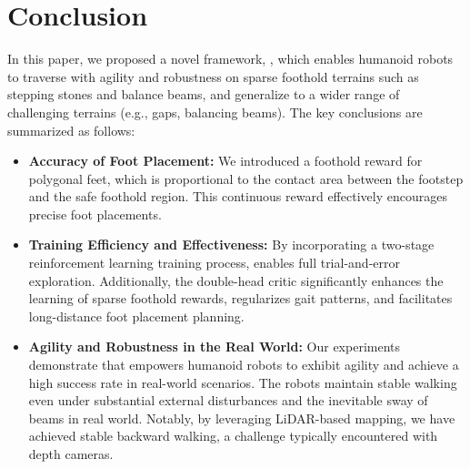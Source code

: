\section{Conclusion}

In this paper, we proposed a novel framework, \beamdojo, which enables humanoid robots to traverse with agility and robustness on sparse foothold terrains such as stepping stones and balance beams, and generalize to a wider range of challenging terrains (e.g., gaps, balancing beams). The key conclusions are summarized as follows:

\begin{itemize}
    \item \textbf{Accuracy of Foot Placement:} We introduced a foothold reward for polygonal feet, which is proportional to the contact area between the footstep and the safe foothold region. This continuous reward effectively encourages precise foot placements.
    
    \item \textbf{Training Efficiency and Effectiveness:} By incorporating a two-stage reinforcement learning training process, \beamdojo enables full trial-and-error exploration. Additionally, the double-head critic significantly enhances the learning of sparse foothold rewards, regularizes gait patterns, and facilitates long-distance foot placement planning.
    
    \item \textbf{Agility and Robustness in the Real World:} Our experiments demonstrate that \beamdojo empowers humanoid robots to exhibit agility and achieve a high success rate in real-world scenarios. The robots maintain stable walking even under substantial external disturbances and the inevitable sway of beams in real world. Notably, by leveraging LiDAR-based mapping, we have achieved stable backward walking, a challenge typically encountered with depth cameras.
\end{itemize}
